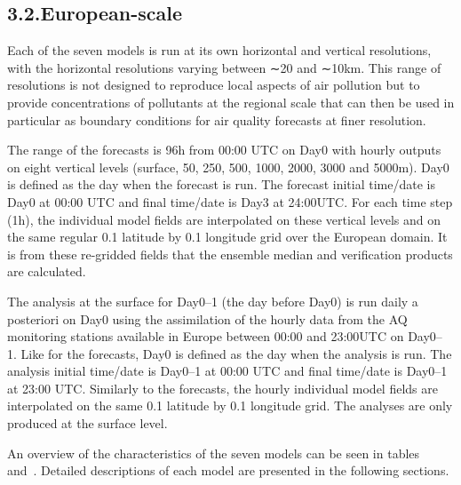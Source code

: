\documentclass[9pt]{report}
\begin{document}
\subsection{3.2.\hspace*{0.5em}European-scale}\label{sec-european-scale}%

\noindent{}Each of the seven models is run at its own horizontal and vertical resolutions, with the horizontal resolutions varying between ∼20 and ∼10km. 
This range of resolutions is not designed to reproduce local aspects of air pollution but to provide concentrations of pollutants at the regional scale that can then be used in particular as boundary conditions for air quality forecasts at finer resolution.%

The range of the forecasts is 96h from 00:00 UTC on Day0 with hourly outputs on eight vertical levels (surface, 50, 250, 500, 1000, 2000, 3000 and 5000m). 
Day0 is defined as the day when the forecast is run. 
The forecast initial time/date is Day0 at 00:00 UTC and final time/date is Day3 at 24:00UTC. 
For each time step (1h), the individual model fields are interpolated on these vertical levels and on the same regular 0.1\textdegree{} latitude by 0.1\textdegree{} longitude grid over the European domain. 
It is from these re-gridded fields that the ensemble median and verification products are calculated.%

The analysis at the surface for Day0–1 (the day before Day0) is run daily a posteriori on Day0 using the assimilation of the hourly data from the AQ monitoring stations available in Europe between 00:00 and 23:00UTC on Day0– 1. 
Like for the forecasts, Day0 is defined as the day when the analysis is run. 
The analysis initial time/date is Day0–1 at 00:00 UTC and final time/date is Day0–1 at 23:00 UTC. 
Similarly to the forecasts, the hourly individual model fields are interpolated on the same 0.1\textdegree{} latitude by 0.1\textdegree{} longitude grid. 
The analyses are only produced at the surface level.%

An overview of the characteristics of the seven models can be seen in tables~ and~.
Detailed descriptions of each model are presented in the following sections.%
\end{document}
